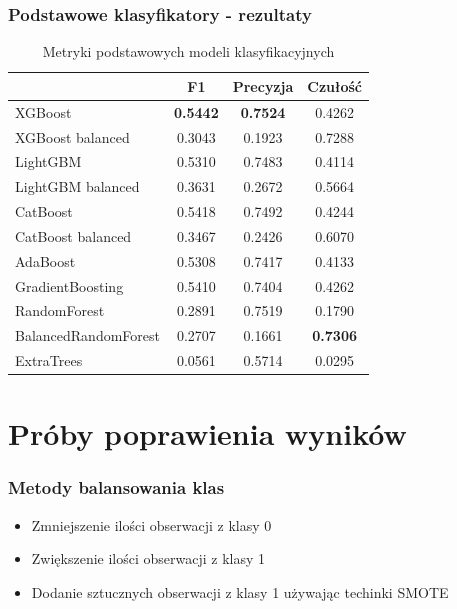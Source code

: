 \documentclass{beamer}
\begin{document}
    \begin{frame}
        \frametitle{Podstawowe klasyfikatory - rezultaty}
        \resizebo
        \begin{table}
            \begin{tabular}{l|*{3}{c}}
                & F1 & Precyzja & Czułość \\
                \hline
                XGBoost & \textbf{0.5442} & \textbf{0.7524} & 0.4262 \\
                XGBoost balanced & 0.3043 & 0.1923 & 0.7288 \\
                LightGBM & 0.5310 & 0.7483 & 0.4114 \\
                LightGBM balanced & 0.3631 & 0.2672 & 0.5664 \\
                CatBoost & 0.5418 & 0.7492 & 0.4244 \\
                CatBoost balanced & 0.3467 & 0.2426 & 0.6070 \\
                AdaBoost & 0.5308 & 0.7417 & 0.4133 \\
                GradientBoosting & 0.5410 & 0.7404 & 0.4262 \\
                RandomForest & 0.2891 & 0.7519 & 0.1790 \\
                BalancedRandomForest & 0.2707 & 0.1661 & \textbf{0.7306} \\
                ExtraTrees & 0.0561 & 0.5714 & 0.0295 \\
            \end{tabular}
            \caption{Metryki podstawowych modeli klasyfikacyjnych}
            \label{tab:score-comparison2}
        \end{table}
    \end{frame}

    \section{Próby poprawienia wyników}

    \begin{frame}
        \frametitle{Metody balansowania klas}
        \begin{itemize}
            \item Zmniejszenie ilości obserwacji z klasy 0
            \item Zwiększenie ilości obserwacji z klasy 1
            \item Dodanie sztucznych obserwacji z klasy 1 używając techinki SMOTE
        \end{itemize}
    \end{frame}
\end{document}
